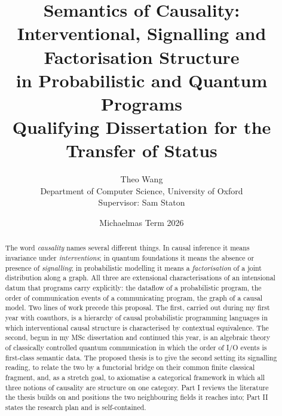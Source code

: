 
\title{Semantics of Causality:\\ Interventional, Signalling and Factorisation Structure\\ in Probabilistic and Quantum Programs\\[1ex]
\large Qualifying Dissertation for the Transfer of Status}
\author{Theo Wang\\ \small Department of Computer Science, University of Oxford\\ \small Supervisor: Sam Staton}
\date{Michaelmas Term 2026}


\maketitle

\begin{abstract}
\noindent
The word \emph{causality} names several different things. In causal inference it means invariance under \emph{interventions}; in quantum foundations it means the absence or presence of \emph{signalling}; in probabilistic modelling it means a \emph{factorisation} of a joint distribution along a graph. All three are extensional characterisations of an intensional datum that programs carry explicitly: the dataflow of a probabilistic program, the order of communication events of a communicating program, the graph of a causal model. Two lines of work precede this proposal. The first, carried out during my first year with coauthors, is a hierarchy of causal probabilistic programming languages in which interventional causal structure is characterised by contextual equivalence. The second, begun in my MSc dissertation and continued this year, is an algebraic theory of classically controlled quantum communication in which the order of I/O events is first-class semantic data. The proposed thesis is to give the second setting its signalling reading, to relate the two by a functorial bridge on their common finite classical fragment, and, as a stretch goal, to axiomatise a categorical framework in which all three notions of causality are structure on one category. Part I reviews the literature the thesis builds on and positions the two neighbouring fields it reaches into; Part II states the research plan and is self-contained.
\end{abstract}

\tableofcontents



\printbibliography




